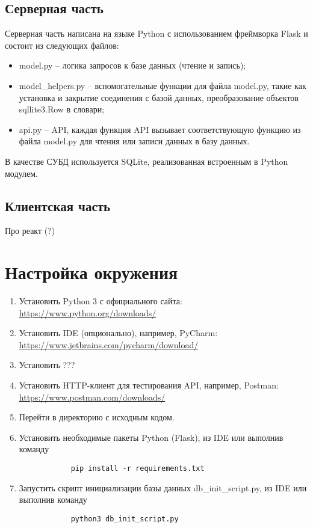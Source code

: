 \documentclass[a4paper,12pt]{report} %
\begin{document}
	\subsection{Серверная часть}
	Серверная часть написана на языке Python с использованием фреймворка Flask и состоит из следующих файлов:
	\begin{itemize}
		\item model.py -- логика запросов к базе данных (чтение и запись);
		\item model\_helpers.py -- вспомогательные функции для файла model.py, такие как установка и закрытие соединения с базой данных, преобразование объектов sqllite3.Row в словари;
		\item api.py -- API, каждая функция API вызывает соответствующую функцию из файла model.py для чтения или записи данных в базу данных.
	\end{itemize}
    В качестве СУБД используется SQLite, реализованная встроенным в Python модулем.
	\subsection{Клиентская часть}
	Про реакт (?)
	\section{Настройка окружения}
	\begin{enumerate}
		\item Установить Python 3 с официального сайта: \url{https://www.python.org/downloads/}
		\item Установить IDE (опционально), например, PyCharm: \url{https://www.jetbrains.com/pycharm/download/} 
		\item Установить ???
		\item Установить HTTP-клиент для тестирования API, например, Postman: \url{https://www.postman.com/downloads/}
		\item Перейти в директорию с исходным кодом.
		\item Установить необходимые пакеты Python (Flask), из IDE или выполнив команду
		\begin{verbatim}
			pip install -r requirements.txt
		\end{verbatim}
	    \item Запустить скрипт инициализации базы данных db\_init\_script.py, из IDE или выполнив команду
	    \begin{verbatim}
	    	python3 db_init_script.py
	    \end{verbatim}
	\end{enumerate}
\end{document}
